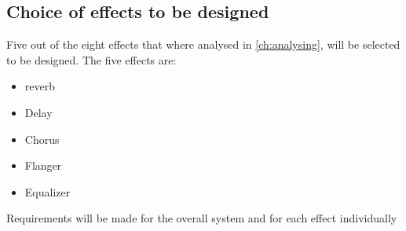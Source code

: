 \subsection{Choice of effects to be designed}
Five out of the eight effects that where analysed in \autoref{ch:analysing}, will be selected to be designed. The five effects are:
\begin{itemize}
	\item \gls{reverb}
	\item Delay
	\item Chorus
	\item Flanger
	\item Equalizer
\end{itemize}

Requirements will be made for the overall system and for each effect individually 
 
 